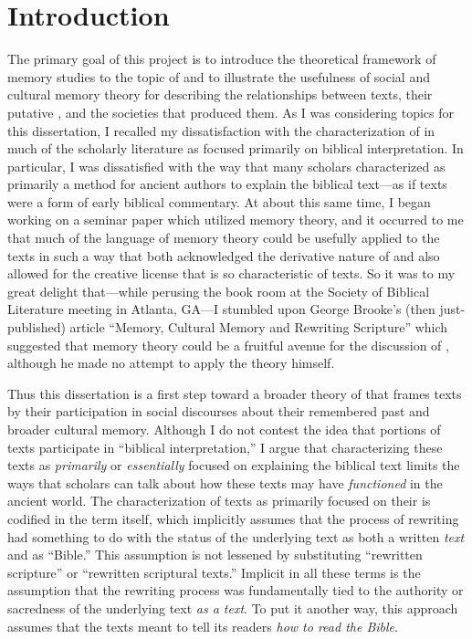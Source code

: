 
\chapter*{Introduction}


The primary goal of this project is to introduce the theoretical framework of memory studies to the topic of \rwb and to illustrate the usefulness of social and cultural memory theory for describing the relationships between \rwb texts, their putative \vorlagen, and the societies that produced them. As I was considering topics for this dissertation, I recalled my dissatisfaction with the characterization of \rwb in much of the scholarly literature as focused primarily on biblical interpretation. In particular, I was dissatisfied with the way that many scholars characterized \rwb as primarily a method for ancient authors to explain the biblical text---as if \rwb texts were a form of early biblical commentary. At about this same time, I began working on a seminar paper which utilized memory theory, and it occurred to me that much of the language of memory theory could be usefully applied to the \rwb texts in such a way that both acknowledged the derivative nature of \rwb and also allowed for the creative license that is so characteristic of \rwb texts. So it was to my great delight that---while perusing the book room at the Society of Biblical Literature meeting in Atlanta, GA---I stumbled upon George Brooke's (then just-published) article ``Memory, Cultural Memory and Rewriting Scripture'' which suggested that memory theory could be a fruitful avenue for the discussion of \rwb, although he made no attempt to apply the theory himself.%
    \autocite{brooke_zsengeller2014}

Thus this dissertation is a first step toward a broader theory of \rwb that frames \rwb texts by their participation in social discourses about their remembered past and broader cultural memory. Although I do not contest the idea that portions of \rwb texts participate in ``biblical interpretation,'' I argue that characterizing these texts as \emph{primarily} or \emph{essentially} focused on explaining the biblical text limits the ways that scholars can talk about how these texts may have \emph{functioned} in the ancient world. The characterization of \rwb texts as primarily focused on their \vorlagen is codified in the term \rwb itself, which implicitly assumes that the process of rewriting had something to do with the status of the underlying text as both a written \emph{text} and as ``Bible.'' This assumption is not lessened by substituting ``rewritten scripture'' or ``rewritten scriptural texts.'' Implicit in all these terms is the assumption that the rewriting process was fundamentally tied to the authority or sacredness of the underlying text \emph{as a text}. To put it another way, this approach assumes that the \rwb texts meant to tell its readers \emph{how to read the Bible}.

